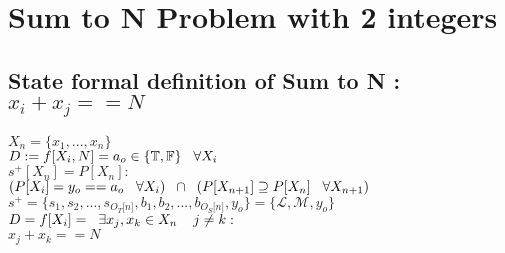 \documentclass[11pt]{article}
\begin{document}







\newpage
\section{Sum to N Problem with 2 integers}
\subsection{State formal definition of Sum to N : $x_i + x_j == N$}
\begin{center}
\vspace{1.5mm}
$
X_n= \{x_1,...,x_n\}
$
\\ \vspace{6mm}
$
D := f \lbrack X_i,N \rbrack = a_{o} \in \{\mathbb{T}, \mathbb{F}\} \hspace{3mm} \forall X_i
$
\\ \vspace{6mm}
$
s^+[X_n]= P[X_n] :
$
\\ \vspace{2mm}
$
(P \lbrack X_i \rbrack = y_{o} == a_{o} \hspace{3mm} \forall X_i) \hspace{2mm} \cap \hspace{2mm} (P[{X}_{n+1}] \supseteq P[X_n] \hspace{3mm} \forall X_{n+1})
$
\\ \vspace{6mm}
$
s^+ = \{ s_1,s_2,...,s_{O_T \lbrack n \rbrack }, b_1, b_2,...,b_{O_S \lbrack n \rbrack},y_o \} = \{ \mathcal{L},\mathcal{M},y_o\}
$
\\ \vspace{6mm}
$
D = f[X_i] = \hspace{2mm} \exists x_j,x_k \in X_n \hspace{4mm} j\neq k: 
$
\\ \vspace{2mm}
$
x_j + x_k == N
$
\end{center}
\end{document}
